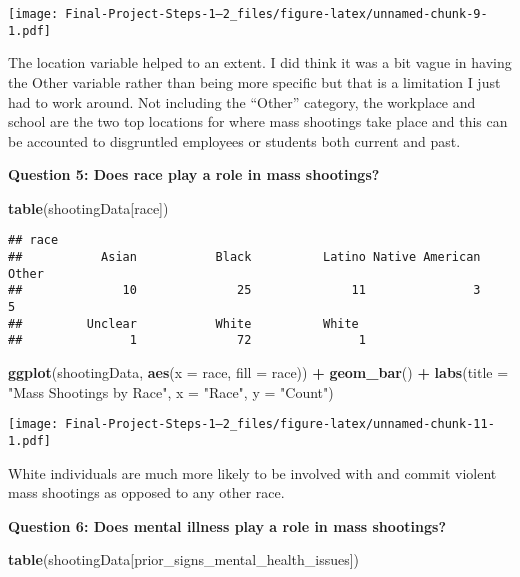 \documentclass[
]{article}
\newenvironment{Shaded}{\begin{snugshade}}{\end{snugshade}}
\newcommand{\AttributeTok}[1]{\textcolor[rgb]{0.13,0.29,0.53}{#1}}
\newcommand{\FunctionTok}[1]{\textcolor[rgb]{0.13,0.29,0.53}{\textbf{#1}}}
\newcommand{\NormalTok}[1]{#1}
\newcommand{\SpecialCharTok}[1]{\textcolor[rgb]{0.81,0.36,0.00}{\textbf{#1}}}
\newcommand{\StringTok}[1]{\textcolor[rgb]{0.31,0.60,0.02}{#1}}
\begin{document}
\texttt{[image: Final-Project-Steps-1---2\_files/figure-latex/unnamed-chunk-9-1.pdf]}

The location variable helped to an extent. I did think it was a bit
vague in having the Other variable rather than being more specific but
that is a limitation I just had to work around. Not including the
``Other'' category, the workplace and school are the two top locations
for where mass shootings take place and this can be accounted to
disgruntled employees or students both current and past.

\textbf{Question 5: Does race play a role in mass shootings?}

\begin{Shaded}
\begin{Highlighting}[]
\FunctionTok{table}\NormalTok{(shootingData[}\StringTok{\textquotesingle{}race\textquotesingle{}}\NormalTok{])}
\end{Highlighting}
\end{Shaded}

\begin{verbatim}
## race
##           Asian           Black          Latino Native American           Other 
##              10              25              11               3               5 
##         Unclear           White          White  
##               1              72               1
\end{verbatim}

\begin{Shaded}
\begin{Highlighting}[]
\FunctionTok{ggplot}\NormalTok{(shootingData, }\FunctionTok{aes}\NormalTok{(}\AttributeTok{x =}\NormalTok{ race, }\AttributeTok{fill =}\NormalTok{ race)) }\SpecialCharTok{+} \FunctionTok{geom\_bar}\NormalTok{() }\SpecialCharTok{+} 
  \FunctionTok{labs}\NormalTok{(}\AttributeTok{title =} \StringTok{"Mass Shootings by Race"}\NormalTok{, }\AttributeTok{x =} \StringTok{"Race"}\NormalTok{, }\AttributeTok{y =} \StringTok{"Count"}\NormalTok{)}
\end{Highlighting}
\end{Shaded}

\texttt{[image: Final-Project-Steps-1---2\_files/figure-latex/unnamed-chunk-11-1.pdf]}

White individuals are much more likely to be involved with and commit
violent mass shootings as opposed to any other race.

\textbf{Question 6: Does mental illness play a role in mass shootings?}

\begin{Shaded}
\begin{Highlighting}[]
\FunctionTok{table}\NormalTok{(shootingData[}\StringTok{\textquotesingle{}prior\_signs\_mental\_health\_issues\textquotesingle{}}\NormalTok{])}
\end{Highlighting}
\end{Shaded}
\end{document}
